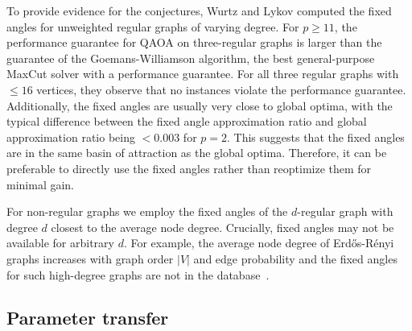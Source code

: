 \documentclass[twocolumn,
english,
aps,
pra,
10pt,
longbibliography,
superscriptaddress,
amsmath,
amssymb,
floatfix
]{revtex4-2}
\begin{document}
{To provide evidence for the conjectures, Wurtz and Lykov computed the fixed angles for unweighted regular graphs of varying degree. For $p \geq 11$, the performance guarantee for QAOA on
three-regular graphs is larger than the guarantee of the Goemans-Williamson algorithm, the best general-purpose
MaxCut solver with a performance guarantee. 
For all three regular graphs with $\leq 16$ vertices, they observe that no instances violate the performance guarantee. 
Additionally, the fixed angles are usually very close to global optima, with the typical difference between the fixed angle approximation ratio and global approximation ratio being $< 0.003$ for $p = 2$.
This suggests that the fixed angles are in the same basin of attraction as the global optima.
Therefore, it can be preferable to directly use the fixed angles rather than reoptimize them for minimal gain.

For non-regular graphs we employ the fixed angles of the $d$-regular graph with degree $d$ closest to the average node degree.
Crucially, fixed angles
may not be available for arbitrary $d$.
For example, the average node degree of Erd\H{o}s-R\'{e}nyi graphs increases with graph order $|V|$ and edge probability and the fixed angles for such high-degree graphs are not in the database~\cite{WurtzGithub}.


\subsection{Parameter transfer}

}
\end{document}

